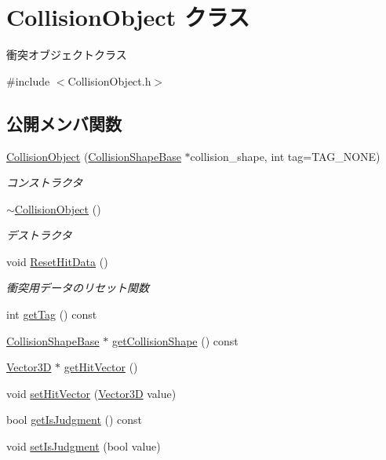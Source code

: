\hypertarget{class_collision_object}{}\section{Collision\+Object クラス}
\label{class_collision_object}


衝突オブジェクトクラス  




{\ttfamily \#include $<$Collision\+Object.\+h$>$}

\subsection*{公開メンバ関数}
\begin{DoxyCompactItemize}
\item 
\mbox{\hyperlink{class_collision_object_a6f502c16aaae1dc1470107a930f28808}{Collision\+Object}} (\mbox{\hyperlink{class_collision_shape_base}{Collision\+Shape\+Base}} $\ast$collision\+\_\+shape, int tag=T\+A\+G\+\_\+\+N\+O\+NE)
\begin{DoxyCompactList}\small\item\em コンストラクタ \end{DoxyCompactList}\item 
\mbox{\hyperlink{class_collision_object_a8c4e6916bc5911b8a82498536d5a27e1}{$\sim$\+Collision\+Object}} ()
\begin{DoxyCompactList}\small\item\em デストラクタ \end{DoxyCompactList}\item 
void \mbox{\hyperlink{class_collision_object_a92dd5d21c6674605d290e0d37d64505a}{Reset\+Hit\+Data}} ()
\begin{DoxyCompactList}\small\item\em 衝突用データのリセット関数 \end{DoxyCompactList}\item 
int \mbox{\hyperlink{class_collision_object_a1198d5941d2ba8a9b394c0e43e4b9fd9}{get\+Tag}} () const
\item 
\mbox{\hyperlink{class_collision_shape_base}{Collision\+Shape\+Base}} $\ast$ \mbox{\hyperlink{class_collision_object_a3ff1c2d794f520c96b6bc6037a8f8f8c}{get\+Collision\+Shape}} () const
\item 
\mbox{\hyperlink{class_vector3_d}{Vector3D}} $\ast$ \mbox{\hyperlink{class_collision_object_adb01187ec10302f13034407a3c852860}{get\+Hit\+Vector}} ()
\item 
void \mbox{\hyperlink{class_collision_object_a1087fa9cebfe0b1675923807b73d8868}{set\+Hit\+Vector}} (\mbox{\hyperlink{class_vector3_d}{Vector3D}} value)
\item 
bool \mbox{\hyperlink{class_collision_object_ac11b01882a159efadbe62bd5a66c49aa}{get\+Is\+Judgment}} () const
\item 
void \mbox{\hyperlink{class_collision_object_a3000144caea71e39cbdafebb249fef7e}{set\+Is\+Judgment}} (bool value)
\end{DoxyCompactItemize}


